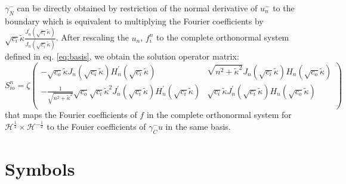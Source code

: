 \documentclass[12pt,journal,compsoc, onecolumn]{IEEEtran}
\begin{document}
$\gamma_N^-$ can be directly obtained by restriction of the normal derivative of $u_n^-$ to the boundary 
which is equivalent to multiplying the Fourier coefficients by $\sqrt{c_i} \tilde \kappa\frac{J_n^\prime(\sqrt{c_i}\tilde \kappa)}{J_n(\sqrt{c_i}\tilde \kappa)}$.
After rescaling the $u_n$, $f_i^n$ to the complete orthonormal system defined in eq. \ref{eq:basis},
we obtain the solution operator matrix: 
\begin{equation}
    S_{io}^n = 
    \zeta
    \begin{pmatrix}
        -\sqrt{c_o}\tilde \kappa J_n(\sqrt{c_i} \tilde \kappa) H_n^\prime(\sqrt{c_i} \tilde \kappa) & 
        \sqrt{n^2 + \tilde \kappa^2} J_n(\sqrt{c_i} \tilde \kappa) H_n(\sqrt{c_o} \tilde \kappa)  \\
        -\frac{1}{\sqrt{n^2 + \tilde \kappa^2}}\sqrt{c_o}\sqrt{c_i} \tilde \kappa^2 J^\prime_n(\sqrt{c_i} \tilde \kappa) H_n^\prime(\sqrt{c_i} \tilde \kappa) & 
        \sqrt{c_i} \tilde \kappa J^\prime_n(\sqrt{c_i} \tilde \kappa) H_n(\sqrt{c_o} \tilde \kappa) \\
    \end{pmatrix}
\end{equation}
\noindent
that maps the Fourier coefficients of $f$ in the complete orthonormal system for $\mathcal{H}^{\frac{1}{2}}\times \mathcal{H}^{-\frac{1}{2}}$
 to the Fouier coefficients of $\gamma_C^-u$ in the same basis.

\newpage
\section*{Symbols}
\end{document}
